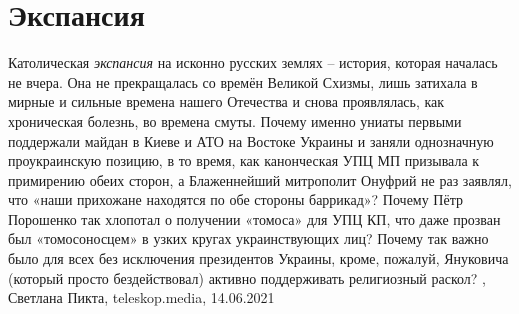 
 
 
 
 
\chapter{Экспансия}
\label{sec:slova.ekspansia}

Католическая \emph{экспансия} на исконно русских землях – история, которая началась не
вчера. Она не прекращалась со времён Великой Схизмы, лишь затихала в мирные и
сильные времена нашего Отечества и снова проявлялась, как хроническая болезнь,
во времена смуты. Почему именно униаты первыми поддержали майдан в Киеве и АТО
на Востоке Украины и заняли однозначную проукраинскую позицию, в то время, как
канонческая УПЦ МП призывала к примирению обеих сторон, а Блаженнейший
митрополит Онуфрий не раз заявлял, что «наши прихожане находятся по обе стороны
баррикад»? Почему Пётр Порошенко так хлопотал о получении «томоса» для УПЦ КП,
что даже прозван был «томосоносцем» в узких кругах украинствующих лиц?  Почему
так важно было для всех без исключения президентов Украины, кроме, пожалуй,
Януковича (который просто бездействовал) активно поддерживать религиозный
раскол?
, 
Светлана Пикта, teleskop.media, 14.06.2021


